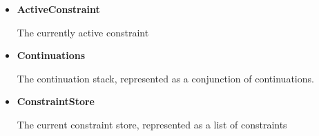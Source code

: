 \begin{itemize}
\item \textbf{ActiveConstraint}

The currently active constraint
\item \textbf{Continuations}

The continuation stack, represented as a conjunction of continuations.
\item \textbf{ConstraintStore}

The current constraint store, represented as a list of constraints
\end{itemize}

\newpage
